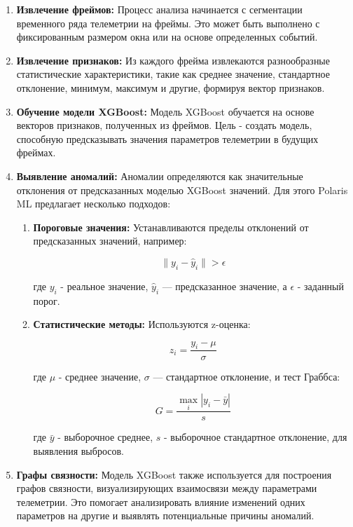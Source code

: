 \documentclass[14pt, a4paper]{extreport}
\begin{document}
    \begin{enumerate}[label=\arabic*.]
        \item \textbf{Извлечение фреймов:} Процесс анализа начинается с сегментации временного ряда телеметрии на фреймы.
        Это может быть выполнено с фиксированным размером окна или на основе определенных событий.
        \item \textbf{Извлечение признаков:} Из каждого фрейма извлекаются разнообразные статистические характеристики, такие как среднее значение, стандартное отклонение, минимум, максимум и другие, формируя вектор признаков.
        \item \textbf{Обучение модели XGBoost:} Модель XGBoost обучается на основе векторов признаков, полученных из фреймов.
        Цель - создать модель, способную предсказывать значения параметров телеметрии в будущих фреймах.
        \item \textbf{Выявление аномалий:} Аномалии определяются как значительные отклонения от предсказанных моделью XGBoost значений.
        Для этого Polaris ML предлагает несколько подходов:
        \begin{enumerate}[label=\alph*.]
            \item \textbf{Пороговые значения:} Устанавливаются пределы отклонений от предсказанных значений, например:

            \[\| y_i - \hat{y}_i \| > \epsilon\]

            где $y_i$ - реальное значение, $\hat{y}_i$ — предсказанное значение, а $\epsilon$ - заданный порог.
            \item \textbf{Статистические методы:} Используются z-оценка:

            \[z_i = \frac{y_i - \mu}{\sigma}\]

            где $\mu$ - среднее значение, $\sigma$ — стандартное отклонение, и тест Граббса:

            \[G = \frac{\max_{i}|y_i - \bar{y}|}{s}\]

            где $\bar{y}$ - выборочное среднее, $s$ - выборочное стандартное отклонение, для выявления выбросов.
        \end{enumerate}
        \item \textbf{Графы связности:} Модель XGBoost также используется для построения графов связности, визуализирующих взаимосвязи между параметрами телеметрии.
        Это помогает анализировать влияние изменений одних параметров на другие и выявлять потенциальные причины аномалий.
    \end{enumerate}
\end{document}
